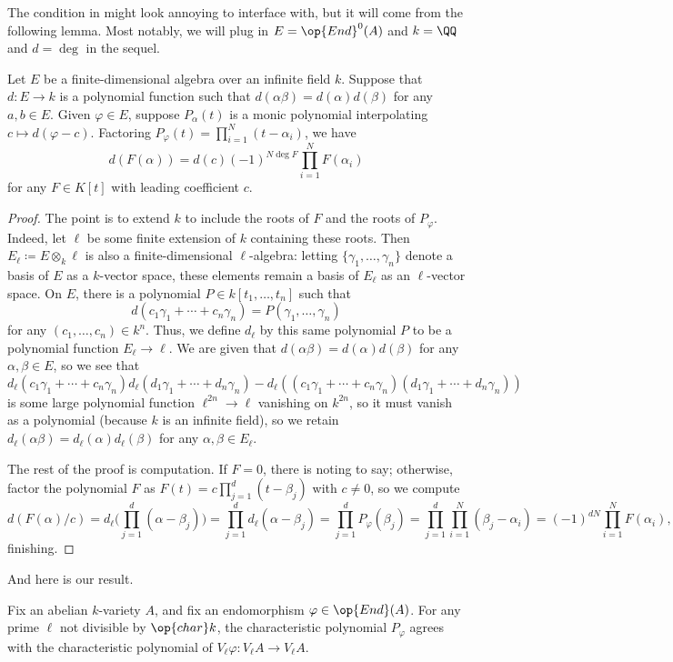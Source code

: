 \documentclass{amsart}
\begin{document}
The condition in  might look annoying to interface with, but it will come from the following lemma. Most notably, we will plug in $E=\op{End}^0(A)$ and $k=\QQ$ and $d=\deg$ in the sequel.
\begin{lemma} \label{lem:input-to-get-poly-eq}
	Let $E$ be a finite-dimensional algebra over an infinite field $k$. Suppose that $d\colon E\to k$ is a polynomial function such that $d(\alpha\beta)=d(\alpha)d(\beta)$ for any $a,b\in E$. Given $\varphi\in E$, suppose $P_\alpha(t)$ is a monic polynomial interpolating $c\mapsto d(\varphi-c)$. Factoring $P_\varphi(t)=\prod_{i=1}^N(t-\alpha_i)$, we have
	\[d(F(\alpha))=d(c)(-1)^{N\deg F}\prod_{i=1}^NF(\alpha_i)\]
	for any $F\in K[t]$ with leading coefficient $c$.
\end{lemma}
\begin{proof}
	The point is to extend $k$ to include the roots of $F$ and the roots of $P_\varphi$. Indeed, let $\ell$ be some finite extension of $k$ containing these roots. Then $E_\ell\coloneqq E\otimes_k\ell$ is also a finite-dimensional $\ell$-algebra: letting $\{\gamma_1,\ldots,\gamma_n\}$ denote a basis of $E$ as a $k$-vector space, these elements remain a basis of $E_\ell$ as an $\ell$-vector space. On $E$, there is a polynomial $P\in k[t_1,\ldots,t_n]$ such that
	\[d(c_1\gamma_1+\cdots+c_n\gamma_n)=P(\gamma_1,\ldots,\gamma_n)\]
	for any $(c_1,\ldots,c_n)\in k^n$. Thus, we define $d_\ell$ by this same polynomial $P$ to be a polynomial function $E_\ell\to\ell$. We are given that $d(\alpha\beta)=d(\alpha)d(\beta)$ for any $\alpha,\beta\in E$, so we see that
	\[d_\ell(c_1\gamma_1+\cdots+c_n\gamma_n)d_\ell(d_1\gamma_1+\cdots+d_n\gamma_n)-d_\ell((c_1\gamma_1+\cdots+c_n\gamma_n)(d_1\gamma_1+\cdots+d_n\gamma_n))\]
	is some large polynomial function $\ell^{2n}\to\ell$ vanishing on $k^{2n}$, so it must vanish as a polynomial (because $k$ is an infinite field), so we retain $d_\ell(\alpha\beta)=d_\ell(\alpha)d_\ell(\beta)$ for any $\alpha,\beta\in E_\ell$.

	The rest of the proof is computation. If $F=0$, there is noting to say; otherwise, factor the polynomial $F$ as $F(t)=c\prod_{j=1}^d(t-\beta_j)$ with $c\ne0$, so we compute
	\[d(F(\alpha)/c)=d_\ell\Bigg(\prod_{j=1}^d(\alpha-\beta_j)\Bigg)=\prod_{j=1}^dd_\ell(\alpha-\beta_j)=\prod_{j=1}^dP_\varphi(\beta_j)=\prod_{j=1}^d\prod_{i=1}^N(\beta_j-\alpha_i)=(-1)^{dN}\prod_{i=1}^NF(\alpha_i),\]
	finishing.
\end{proof}
And here is our result.
\begin{proposition} \label{prop:char-poly-correct}
	Fix an abelian $k$-variety $A$, and fix an endomorphism $\varphi\in\op{End}(A)$. For any prime $\ell$ not divisible by $\op{char}k$, the characteristic polynomial $P_\varphi$ agrees with the characteristic polynomial of $V_\ell\varphi\colon V_\ell A\to V_\ell A$.
\end{proposition}
\end{document}
